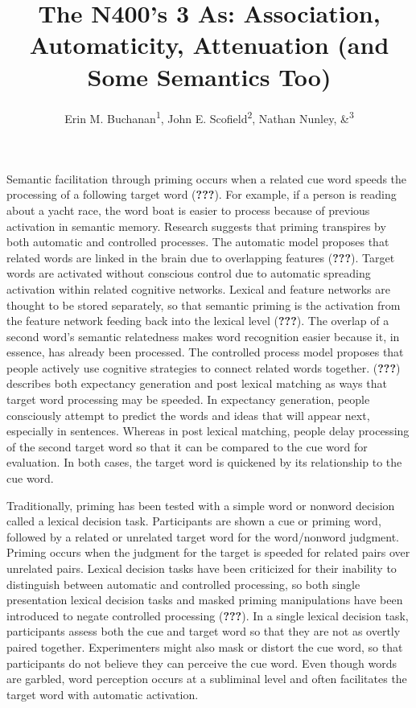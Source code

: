 \documentclass[english,man]{apa6}
\title{The N400's 3 As: Association, Automaticity, Attenuation (and Some
Semantics Too)}
\author{Erin M. Buchanan\textsuperscript{1}, John E. Scofield\textsuperscript{2}, Nathan Nunley, \&\textsuperscript{3}}
\affiliation{
    \vspace{0.5cm}
          \textsuperscript{1} Missouri State University\\
          \textsuperscript{2} University of Missouri\\
          \textsuperscript{3} University of Mississippi  }
\theoremstyle{definition}
\theoremstyle{definition}
\theoremstyle{definition}
\theoremstyle{remark}
\begin{document}
\maketitle

\setcounter{secnumdepth}{0}



Semantic facilitation through priming occurs when a related cue word
speeds the processing of a following target word ({\textbf{???}}). For
example, if a person is reading about a yacht race, the word boat is
easier to process because of previous activation in semantic memory.
Research suggests that priming transpires by both automatic and
controlled processes. The automatic model proposes that related words
are linked in the brain due to overlapping features ({\textbf{???}}).
Target words are activated without conscious control due to automatic
spreading activation within related cognitive networks. Lexical and
feature networks are thought to be stored separately, so that semantic
priming is the activation from the feature network feeding back into the
lexical level ({\textbf{???}}). The overlap of a second word's semantic
relatedness makes word recognition easier because it, in essence, has
already been processed. The controlled process model proposes that
people actively use cognitive strategies to connect related words
together. ({\textbf{???}}) describes both expectancy generation and post
lexical matching as ways that target word processing may be speeded. In
expectancy generation, people consciously attempt to predict the words
and ideas that will appear next, especially in sentences. Whereas in
post lexical matching, people delay processing of the second target word
so that it can be compared to the cue word for evaluation. In both
cases, the target word is quickened by its relationship to the cue word.

Traditionally, priming has been tested with a simple word or nonword
decision called a lexical decision task. Participants are shown a cue or
priming word, followed by a related or unrelated target word for the
word/nonword judgment. Priming occurs when the judgment for the target
is speeded for related pairs over unrelated pairs. Lexical decision
tasks have been criticized for their inability to distinguish between
automatic and controlled processing, so both single presentation lexical
decision tasks and masked priming manipulations have been introduced to
negate controlled processing ({\textbf{???}}). In a single lexical
decision task, participants assess both the cue and target word so that
they are not as overtly paired together. Experimenters might also mask
or distort the cue word, so that participants do not believe they can
perceive the cue word. Even though words are garbled, word perception
occurs at a subliminal level and often facilitates the target word with
automatic activation.
\end{document}
